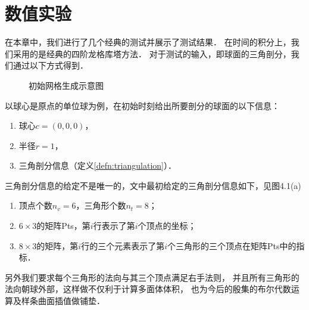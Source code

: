 \chapter{数值实验}
在本章中，我们进行了几个经典的测试并展示了测试结果．
在时间的积分上，我们采用的是经典的四阶龙格库塔方法．
对于测试的输入，即球面的三角剖分，我们通过以下方式得到．

\begin{figure}[htb]
	\label{fig:getTRI}
	\centering
	\hfill
	\caption{初始网格生成示意图}
\end{figure}

以球心是原点的单位球为例，在初始时刻给出所要剖分的球面的以下信息：
\begin{enumerate}
	\setlength{\itemsep}{0pt}
	\setlength{\parsep}{0pt}
	\setlength{\parskip}{0pt}
	\item 球心$c=(0,0,0)$，
	\item 半径$r=1$，
	\item 三角剖分信息（定义\ref{defn:triangulation}）．
\end{enumerate}
三角剖分信息的给定不是唯一的，文中最初给定的三角剖分信息如下，见图4.1(a)
\begin{enumerate}
	\setlength{\itemsep}{0pt}
	\setlength{\parsep}{0pt}
	\setlength{\parskip}{0pt}
	\item 顶点个数$n_v=6$，三角形个数$n_t=8$；
	\item $6\times 3$的矩阵Pts，第$i$行表示了第$i$个顶点的坐标；
	\item $8\times 3$的矩阵，第$i$行的三个元素表示了第$i$个三角形的三个顶点在矩阵Pts中的指标．
\end{enumerate}
另外我们要求每个三角形的法向与其三个顶点满足右手法则，
并且所有三角形的法向朝球外部，这样做不仅利于计算多面体体积，
也为今后的殷集的布尔代数运算及样条曲面插值做铺垫．


